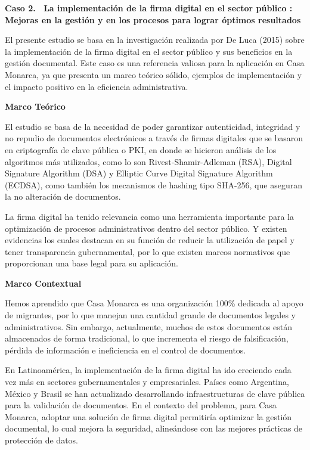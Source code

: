 \documentclass[a4paper,12pt]{article}
\begin{document}
\textbf{{\selectfont Caso 2. \ La implementación de la firma digital en el sector público : Mejoras en la gestión y en los procesos para lograr óptimos resultados}}

{\small {\selectfont 	El presente estudio se basa en la investigación realizada por De Luca (2015) sobre la implementación de la firma digital en el sector público y sus beneficios en la gestión documental. Este caso es una referencia valiosa para la aplicación en Casa Monarca, ya que presenta un marco teórico sólido, ejemplos de implementación y el impacto positivo en la eficiencia administrativa.}}



{\small {\selectfont \textbf{	Marco Teórico}	}}

{\small {\selectfont 	El estudio se basa de la necesidad de poder garantizar autenticidad, integridad y no repudio de documentos electrónicos a través de firmas digitales que se basaron en criptografía de clave pública o PKI, en donde se hicieron análisis de los algoritmos más utilizados, como lo son Rivest-Shamir-Adleman (RSA), Digital Signature Algorithm (DSA) y Elliptic Curve Digital Signature Algorithm (ECDSA), como también los mecanismos de hashing tipo SHA-256, que aseguran la no alteración de documentos.}}

{\small {\selectfont 	La firma digital ha tenido relevancia como una herramienta importante para la optimización de procesos administrativos dentro del sector público. Y existen evidencias los cuales destacan en su función de reducir la utilización de papel y tener transparencia gubernamental, por lo que existen marcos normativos que proporcionan una base legal para su aplicación.}}



{\small {\selectfont \textbf{	Marco Contextual}}}

{\small {\selectfont 	Hemos aprendido que Casa Monarca es una organización 100\% dedicada al apoyo de migrantes, por lo que manejan una cantidad grande de documentos legales y administrativos. Sin embargo, actualmente, muchos de estos documentos están almacenados de forma tradicional, lo que incrementa el riesgo de falsificación, pérdida de información e ineficiencia en el control de documentos.}}

{\small {\selectfont 	En Latinoamérica, la implementación de la firma digital ha ido creciendo cada vez más en sectores gubernamentales y empresariales. Países como Argentina, México y Brasil se han actualizado desarrollando infraestructuras de clave pública para la validación de documentos. En el contexto del problema, para Casa Monarca, adoptar una solución de firma digital permitiría optimizar la gestión documental, lo cual mejora la seguridad, alineándose con las mejores prácticas de protección de datos.}}
\end{document}
